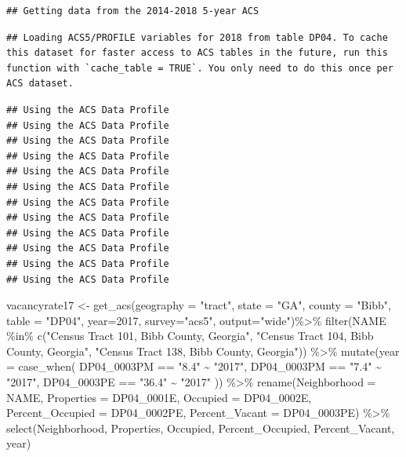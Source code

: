 \documentclass[
]{article}
\newenvironment{Shaded}{\begin{snugshade}}{\end{snugshade}}
\newcommand{\AttributeTok}[1]{\textcolor[rgb]{0.77,0.63,0.00}{#1}}
\newcommand{\DecValTok}[1]{\textcolor[rgb]{0.00,0.00,0.81}{#1}}
\newcommand{\FunctionTok}[1]{\textcolor[rgb]{0.00,0.00,0.00}{#1}}
\newcommand{\NormalTok}[1]{#1}
\newcommand{\OtherTok}[1]{\textcolor[rgb]{0.56,0.35,0.01}{#1}}
\newcommand{\SpecialCharTok}[1]{\textcolor[rgb]{0.00,0.00,0.00}{#1}}
\newcommand{\StringTok}[1]{\textcolor[rgb]{0.31,0.60,0.02}{#1}}
\begin{document}
\begin{verbatim}
## Getting data from the 2014-2018 5-year ACS
\end{verbatim}

\begin{verbatim}
## Loading ACS5/PROFILE variables for 2018 from table DP04. To cache this dataset for faster access to ACS tables in the future, run this function with `cache_table = TRUE`. You only need to do this once per ACS dataset.
\end{verbatim}

\begin{verbatim}
## Using the ACS Data Profile
## Using the ACS Data Profile
## Using the ACS Data Profile
## Using the ACS Data Profile
## Using the ACS Data Profile
## Using the ACS Data Profile
## Using the ACS Data Profile
## Using the ACS Data Profile
## Using the ACS Data Profile
## Using the ACS Data Profile
## Using the ACS Data Profile
## Using the ACS Data Profile
\end{verbatim}

\begin{Shaded}
\begin{Highlighting}[]
\NormalTok{vacancyrate17 }\OtherTok{\textless{}{-}} \FunctionTok{get\_acs}\NormalTok{(}\AttributeTok{geography =} \StringTok{"tract"}\NormalTok{, }\AttributeTok{state =} \StringTok{"GA"}\NormalTok{, }\AttributeTok{county =} \StringTok{"Bibb"}\NormalTok{, }\AttributeTok{table =} \StringTok{"DP04"}\NormalTok{,  }\AttributeTok{year=}\DecValTok{2017}\NormalTok{, }\AttributeTok{survey=}\StringTok{"acs5"}\NormalTok{, }\AttributeTok{output=}\StringTok{"wide"}\NormalTok{)}\SpecialCharTok{\%\textgreater{}\%}
\FunctionTok{filter}\NormalTok{(NAME }\SpecialCharTok{\%in\%} \FunctionTok{c}\NormalTok{(}\StringTok{"Census Tract 101, Bibb County, Georgia"}\NormalTok{, }\StringTok{"Census Tract 104, Bibb County, Georgia"}\NormalTok{, }\StringTok{"Census Tract 138, Bibb County, Georgia"}\NormalTok{)) }\SpecialCharTok{\%\textgreater{}\%}
  \FunctionTok{mutate}\NormalTok{(}\AttributeTok{year =} \FunctionTok{case\_when}\NormalTok{(}
\NormalTok{    DP04\_0003PM }\SpecialCharTok{==} \StringTok{"8.4"} \SpecialCharTok{\textasciitilde{}} \StringTok{"2017"}\NormalTok{,}
\NormalTok{    DP04\_0003PM }\SpecialCharTok{==} \StringTok{"7.4"} \SpecialCharTok{\textasciitilde{}} \StringTok{"2017"}\NormalTok{,}
\NormalTok{    DP04\_0003PE }\SpecialCharTok{==} \StringTok{"36.4"} \SpecialCharTok{\textasciitilde{}} \StringTok{"2017"}
\NormalTok{  )) }\SpecialCharTok{\%\textgreater{}\%}
  \FunctionTok{rename}\NormalTok{(}\AttributeTok{Neighborhood =}\NormalTok{ NAME,}
         \AttributeTok{Properties =}\NormalTok{ DP04\_0001E,}
         \AttributeTok{Occupied =}\NormalTok{ DP04\_0002E,}
         \AttributeTok{Percent\_Occupied =}\NormalTok{ DP04\_0002PE,}
         \AttributeTok{Percent\_Vacant =}\NormalTok{ DP04\_0003PE) }\SpecialCharTok{\%\textgreater{}\%}
   \FunctionTok{select}\NormalTok{(Neighborhood, Properties, Occupied, Percent\_Occupied, Percent\_Vacant, year) }
\end{Highlighting}
\end{Shaded}
\end{document}
